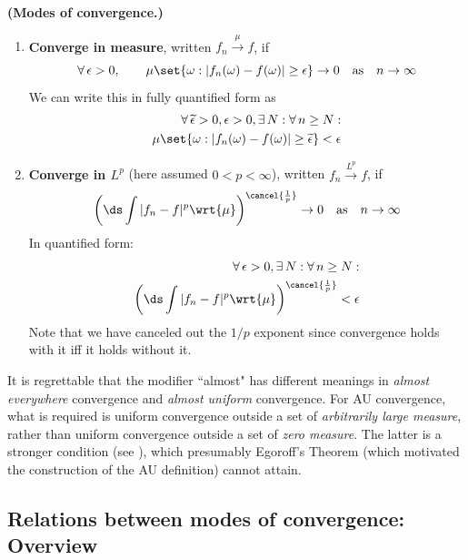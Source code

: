 \documentclass{article} %
\newcommand{\dmu}{\wrt{\mu}}
\newcommand{\epsilontilde}{\widetilde{\epsilon}}
\begin{document}
\begin{definition}{\textbf{(Modes of convergence.)}}
\begin{enumerate}
\item \textbf{Converge in measure}, written $f_n \stackrel{\mu}{\to} f$, if	
\[\forall \, \epsilon >0, \quad \quad \mu \set{\omega : |f_n(\omega) - f(\omega)| \geq \epsilon} \to 0 \quad \text{as} \quad n \to \infty \]
We can write this in fully quantified form as
\begin{align*}
\forall \, \epsilontilde>0, \epsilon>0, \exists \, N : \forall \, n \geq N: \\
\mu \set{\omega : |f_n(\omega) - f(\omega)| \geq \epsilontilde} < \epsilon
\end{align*}
\item \textbf{Converge in $L^p$} (here assumed $0 < p < \infty$), written $f_n \stackrel{L^p}{\to} f$, if	
\[ \bigg( \ds\int |f_n - f|^p \dmu \bigg)^{\cancel{\frac{1}{p}}} \to 0 \quad \text{as} \quad n \to \infty \]
In quantified form:
\begin{align*}
\forall \, \epsilon >0, \exists \, N : \forall \, n \geq N: \\
 \bigg( \ds\int |f_n - f|^p \dmu \bigg)^{\cancel{\frac{1}{p}}} < \epsilon 	
\end{align*}
Note that we have canceled out the $1/p$ exponent since convergence holds with it iff it holds without it. 


\end{enumerate}
\end{definition}

\begin{remark}{}
It is regrettable \cite[pp.72]{bartle2014elements} that the modifier ``almost" has different meanings in \textit{almost everywhere} convergence and \textit{almost uniform} convergence.  For AU convergence, what is required is uniform convergence outside a set of \textit{arbitrarily large measure}, rather than uniform convergence outside a set of \textit{zero measure}.  The latter is a stronger condition (see \cite[Exercise 7J]{bartle2014elements}), which presumably Egoroff's Theorem (which motivated the construction of the AU definition) cannot attain.
\end{remark}


\subsection{Relations between modes of convergence: Overview} \label{sec:overview_of_relations_between_modes_of_convergence}
\end{document}
